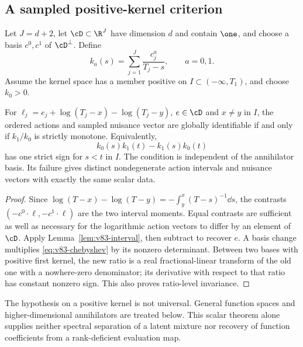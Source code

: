 \subsection{A sampled positive-kernel criterion}
Let $J=d+2$, let $\cD\subset\R^J$ have dimension $d$ and contain
$\one$, and choose a basis $c^0,c^1$ of $\cD^\perp$. Define
\begin{equation}\label{eq:v83-kernels}
 k_a(s)=\sum_{j=1}^J\frac{c_j^a}{T_j-s},\qquad a=0,1.
\end{equation}
Assume the kernel space has a member positive on
$I\subset(-\infty,T_1)$, and choose $k_0>0$.
\begin{theorem}
\label{thm:v83-classification}
For $\ell_j=e_j+\log(T_j-x)-\log(T_j-y)$, $e\in\cD$ and
$x\ne y$ in $I$, the ordered actions and sampled nuisance vector are
globally identifiable if and only if $k_1/k_0$ is strictly monotone.
Equivalently,
\begin{equation}\label{eq:v83-chebyshev}
 k_0(s)k_1(t)-k_1(s)k_0(t)
\end{equation}
has one strict sign for $s<t$ in $I$. The condition is independent of
the annihilator basis. Its failure gives distinct nondegenerate action
intervals and nuisance vectors with exactly the same scalar data.
\end{theorem}
\begin{proof}
Since $\log(T-x)-\log(T-y)=-\int_y^x(T-s)^{-1}\dd s$,
the contrasts $(-c^0\cdot\ell,-c^1\cdot\ell)$ are the two interval
moments. Equal contrasts are sufficient as well as necessary for the
logarithmic action vectors to differ by an element of $\cD$.
Apply Lemma~\ref{lem:v83-interval}, then subtract to recover $e$.
A basis change multiplies \eqref{eq:v83-chebyshev} by its nonzero
determinant. Between two bases with positive first kernel, the new
ratio is a real fractional-linear transform of the old one with a
nowhere-zero denominator; its derivative with respect to that ratio
has constant nonzero sign. This also proves ratio-level invariance.
\end{proof}
The hypothesis on a positive kernel is not universal. General function
spaces and higher-dimensional annihilators are treated below. This
scalar theorem alone supplies neither spectral separation of a latent
mixture nor recovery of function coefficients from a rank-deficient
evaluation map.

